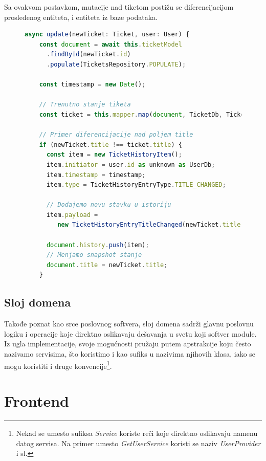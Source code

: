 \documentclass[12pt,oneside]{memoir}
\begin{document}
Sa ovakvom postavkom, mutacije nad tiketom postižu se diferencijacijom prosleđenog entiteta, i entiteta iz baze podataka.

\begin{figure}[h]
\begin{lstlisting}[language=JavaScript, style=ES6, caption={Fajl \textit{ticket.repository.ts}}]
  async update(newTicket: Ticket, user: User) {
    const document = await this.ticketModel
      .findById(newTicket.id)
      .populate(TicketsRepository.POPULATE); 

    const timestamp = new Date();

    // Trenutno stanje tiketa
    const ticket = this.mapper.map(document, TicketDb, Ticket);

    // Primer diferencijacije nad poljem title
    if (newTicket.title !== ticket.title) {
      const item = new TicketHistoryItem();
      item.initiator = user.id as unknown as UserDb;
      item.timestamp = timestamp;
      item.type = TicketHistoryEntryType.TITLE_CHANGED;

      // Dodajemo novu stavku u istoriju
      item.payload = 
         new TicketHistoryEntryTitleChanged(newTicket.title);
         
      document.history.push(item);
      // Menjamo snapshot stanje
      document.title = newTicket.title;
    }
\end{lstlisting}
\end{figure}



\newpage
\section{Sloj domena}

Takođe poznat kao srce poslovnog softvera, sloj domena sadrži glavnu poslovnu logiku i operacije koje direktno oslikavaju dešavanja u svetu koji softver module. Iz ugla implementacije, svoje mogućnosti pružaju putem apstrakcije koju često nazivamo servisima, što koristimo i kao sufiks u nazivima njihovih klasa, iako se mogu koristiti i druge konvencije\footnote{Nekad se umesto sufiksa \textit{Service} koriste reči koje direktno oslikavaju namenu datog servisa. Na primer umesto \textit{GetUserService} koristi se naziv \textit{UserProvider} i sl.}.

\chapter{Frontend}
\end{document}
